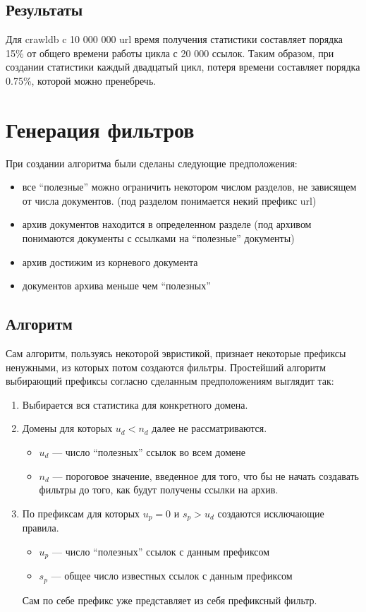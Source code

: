 \subsection*{Результаты}
Для crawldb c 10 000 000 url время получения статистики составляет порядка 15\% от общего времени работы цикла с 20 000 ссылок. Таким образом, при создании статистики каждый двадцатый цикл, потеря времени составляет порядка 0.75\%, которой  можно пренебречь.

\section{Генерация фильтров}
При создании алгоритма были сделаны следующие предположения:
\begin{itemize}
 \item все ``полезные'' можно ограничить некотором числом разделов, не зависящем от числа документов. (под разделом понимается некий префикс url)
 \item архив документов находится в определенном разделе (под архивом понимаются документы с ссылками на ``полезные'' документы)
 \item архив достижим из корневого документа
 \item документов архива меньше чем ``полезных''
\end{itemize}

\subsection{Алгоритм}
Сам алгоритм, пользуясь некоторой эвристикой, признает некоторые префиксы ненужными, из которых потом создаются фильтры.
Простейший алгоритм выбирающий префиксы согласно сделанным предположениям выглядит так:
\begin{enumerate}
 \item Выбирается вся статистика для конкретного домена.
 \item Домены для которых $u_{d}<n_{d}$ далее не рассматриваются.
 \begin{itemize}
  \item $u_{d}$ --- число ``полезных'' ссылок во всем домене
  \item $n_{d}$ --- пороговое значение, введенное для того, что бы не начать создавать фильтры до того, как будут получены ссылки на архив.
 \end{itemize}

 \item По префиксам для которых $u_{p}=0$ и $s_{p}>u_{d}$ создаются исключающие правила.
 \begin{itemize}
  \item $u_{p}$ --- число ``полезных'' ссылок с данным префиксом
  \item $s_{p}$ --- общее число известных ссылок с данным префиксом
 \end{itemize}
 Сам по себе префикс уже представляет из себя префиксный фильтр.
\end{enumerate}


